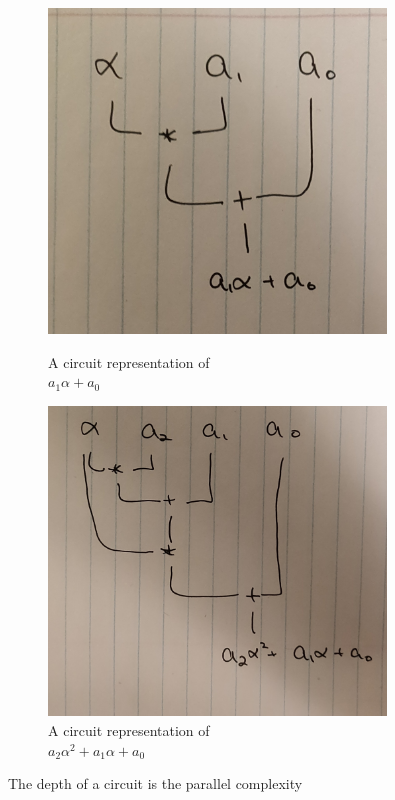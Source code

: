 \begin{figure}[h]
    \centering
    \captionsetup{justification=centering}
    \begin{minipage}{.5\textwidth}
      \centering
      \includegraphics[width=0.8\textwidth]{images/lec4-circuit-1}
      \caption{A circuit representation of \\ $a_1\alpha + a_0$}
      \label{fig:lec4-circuit-1}
    \end{minipage}%
    \begin{minipage}{.5\textwidth}
      \centering
      \includegraphics[width=0.8\textwidth]{images/lec4-circuit-2}
      \caption{{\footnotesize A circuit representation of \\ $a_2\alpha^2 + a_1\alpha + a_0$}}
      \label{fig:lec4-circuit-2}
    \end{minipage}
\end{figure}

\begin{remark}
    The depth of a circuit is the parallel complexity
\end{remark}